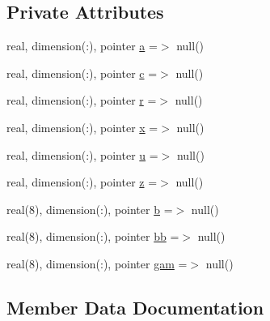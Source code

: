 \subsection*{Private Attributes}
\begin{DoxyCompactItemize}
\item 
real, dimension(\+:), pointer \mbox{\hyperlink{structmodulehydrodynamic_1_1t__coef__1d_a315b258c5d03283ef4b0d268252d7f24}{a}} =$>$ null()
\item 
real, dimension(\+:), pointer \mbox{\hyperlink{structmodulehydrodynamic_1_1t__coef__1d_a391c2206d20697c5cefd8f053d21814c}{c}} =$>$ null()
\item 
real, dimension(\+:), pointer \mbox{\hyperlink{structmodulehydrodynamic_1_1t__coef__1d_a9c9d4b0b4ce723a31ba18bf8771a558a}{r}} =$>$ null()
\item 
real, dimension(\+:), pointer \mbox{\hyperlink{structmodulehydrodynamic_1_1t__coef__1d_aafd7f256f60bc632bd2195d824eb443b}{x}} =$>$ null()
\item 
real, dimension(\+:), pointer \mbox{\hyperlink{structmodulehydrodynamic_1_1t__coef__1d_aba0c80541d536c743f43e869654f1fea}{u}} =$>$ null()
\item 
real, dimension(\+:), pointer \mbox{\hyperlink{structmodulehydrodynamic_1_1t__coef__1d_a1aab07f4bf4aeca715e2b014e6dc3c1c}{z}} =$>$ null()
\item 
real(8), dimension(\+:), pointer \mbox{\hyperlink{structmodulehydrodynamic_1_1t__coef__1d_a2c46b6470eb92c81accbe9fa19f0e222}{b}} =$>$ null()
\item 
real(8), dimension(\+:), pointer \mbox{\hyperlink{structmodulehydrodynamic_1_1t__coef__1d_aa9defd16f7b2824b773d868686943327}{bb}} =$>$ null()
\item 
real(8), dimension(\+:), pointer \mbox{\hyperlink{structmodulehydrodynamic_1_1t__coef__1d_af1b4cb028dde193d4f25f579c878f560}{gam}} =$>$ null()
\end{DoxyCompactItemize}


\subsection{Member Data Documentation}
\mbox{\label{structmodulehydrodynamic_1_1t__coef__1d_a315b258c5d03283ef4b0d268252d7f24}} 
